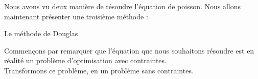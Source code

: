 Nous avons vu deux manière de résoudre l'équation de poisson. Nous allons maintenant présenter une troisième méthode  : \\
\begin{center}
Le méthode de Douglas
\end{center}
Commençons par remarquer que l'équation que nous souhaitons résoudre est en réalité un problème d'optimisation avec contraintes.\\
Transformons ce problème, en un problème sans contraintes.   
